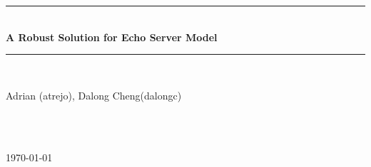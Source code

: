 \documentclass[12pt]{article}
\begin{document}

\begin{titlepage}

\newcommand{\HRule}{\rule{\linewidth}{0.5mm}} %

\center %

\HRule \\[0.4cm]
{\large \bfseries A Robust Solution for Echo Server Model}\\[0.4cm] %
\HRule \\[1.5cm]

\begin{minipage}{0.6\textwidth}
\begin{flushright}
  \large
Adrian (atrejo),
Dalong Cheng(dalongc) 
\end{flushright}
\end{minipage}
~
\begin{minipage}{0.4\textwidth}
\begin{flushright} \large

\end{flushright}
\end{minipage}\\[4cm]

{\large \today}\\[3cm] %


\vfill %



\end{titlepage}

\tableofcontents %
\setcounter{page}{2}

\newpage %

\end{document}
